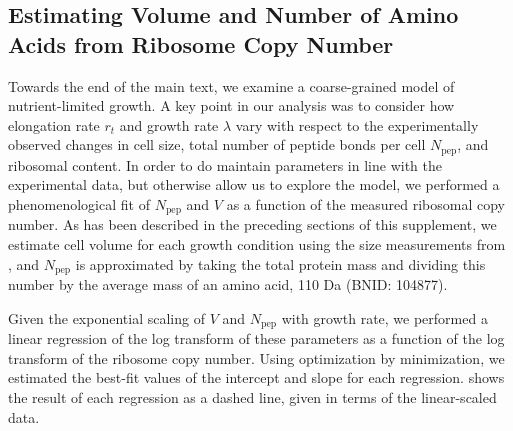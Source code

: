 \subsection{Estimating Volume and Number of Amino Acids from Ribosome Copy Number}
Towards the end of the main text, we examine a coarse-grained model of
nutrient-limited growth. A key point in our analysis was to consider  how
elongation rate $r_t$ and growth rate $\lambda$ vary with respect to the
experimentally observed changes in cell size, total number of peptide bonds per
cell  $N_\text{pep}$, and ribosomal content.  In order to do maintain parameters
in line with the experimental data, but otherwise  allow us to explore the
model, we performed a phenomenological fit of $N_\text{pep}$ and $V$ as a
function of the measured ribosomal copy number. As has been described in the
preceding sections of this supplement, we estimate cell volume for each growth
condition using the size measurements from \cite{si2017,si2019}, and
$N_\text{pep}$ is approximated by taking the total protein mass and dividing
this number by the average mass of an amino acid, 110 Da (BNID: 104877).

Given the  exponential scaling of $V$ and $N_\text{pep}$ with growth rate,
we performed a linear regression of the log transform of these parameters
as a function of the log transform of the ribosome copy number. Using
optimization by minimization, we estimated the best-fit values of the intercept
and slope for each regression.  shows the result of each
regression as a dashed line, given in terms of the linear-scaled data.

\begin{figure}
\end{figure}
